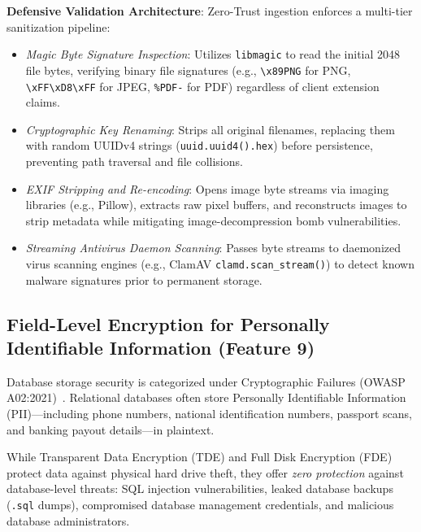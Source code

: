\documentclass[10pt,twocolumn,a4paper]{article}
\begin{document}
\noindent\textbf{Defensive Validation Architecture}: Zero-Trust ingestion enforces a multi-tier sanitization pipeline:
\begin{itemize}[leftmargin=*]
    \item \textit{Magic Byte Signature Inspection}: Utilizes \texttt{libmagic} to read the initial 2048 file bytes, verifying binary file signatures (e.g., \texttt{\textbackslash x89PNG} for PNG, \texttt{\textbackslash xFF\textbackslash xD8\textbackslash xFF} for JPEG, \texttt{\%PDF-} for PDF) regardless of client extension claims.
    \item \textit{Cryptographic Key Renaming}: Strips all original filenames, replacing them with random UUIDv4 strings (\texttt{uuid.uuid4().hex}) before persistence, preventing path traversal and file collisions.
    \item \textit{EXIF Stripping and Re-encoding}: Opens image byte streams via imaging libraries (e.g., Pillow), extracts raw pixel buffers, and reconstructs images to strip metadata while mitigating image-decompression bomb vulnerabilities.
    \item \textit{Streaming Antivirus Daemon Scanning}: Passes byte streams to daemonized virus scanning engines (e.g., ClamAV \texttt{clamd.scan\_stream()}) to detect known malware signatures prior to permanent storage.
\end{itemize}

\subsection{Field-Level Encryption for Personally Identifiable Information (Feature 9)}
Database storage security is categorized under Cryptographic Failures (OWASP A02:2021)~\cite{owasp_top10_2021}. Relational databases often store Personally Identifiable Information (PII)---including phone numbers, national identification numbers, passport scans, and banking payout details---in plaintext.

While Transparent Data Encryption (TDE) and Full Disk Encryption (FDE) protect data against physical hard drive theft, they offer \textit{zero protection} against database-level threats: SQL injection vulnerabilities, leaked database backups (\texttt{.sql} dumps), compromised database management credentials, and malicious database administrators.
\end{document}
